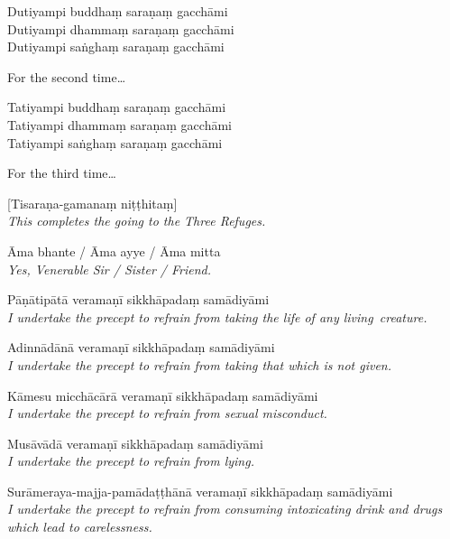 Dutiyampi buddhaṃ saraṇaṃ gacchāmi\\
Dutiyampi dhammaṃ saraṇaṃ gacchāmi\\
Dutiyampi saṅghaṃ saraṇaṃ gacchāmi

\begin{english}
  For the second time\ldots
\end{english}

Tatiyampi buddhaṃ saraṇaṃ gacchāmi\\
Tatiyampi dhammaṃ saraṇaṃ gacchāmi\\
Tatiyampi saṅghaṃ saraṇaṃ gacchāmi

\begin{english}
  For the third time\ldots
\end{english}


[Tisaraṇa-gamanaṃ niṭṭhitaṃ]\\
\emph{This completes the going to the Three Refuges.}


Āma bhante / Āma ayye / Āma mitta\\
\emph{Yes, Venerable Sir / Sister / Friend.}


\enlargethispage{-\baselineskip}

{\raggedright

\begin{packedenumerate}
  \item Pāṇātipātā veramaṇī sikkhāpadaṃ samādiyāmi\\
    \emph{I undertake the precept to refrain from taking the life of any living~creature.}
  \item Adinnādānā veramaṇī sikkhāpadaṃ samādiyāmi\\
    \emph{I undertake the precept to refrain from taking that which is not given.}
  \item Kāmesu micchācārā veramaṇī sikkhāpadaṃ samādiyāmi\\
    \emph{I undertake the precept to refrain from sexual misconduct.}
  \item Musāvādā veramaṇī sikkhāpadaṃ samādiyāmi\\
    \emph{I undertake the precept to refrain from lying.}
  \item Surāmeraya-majja-pamādaṭṭhānā veramaṇī sikkhāpadaṃ samādiyāmi\\
    \emph{I undertake the precept to refrain from consuming intoxicating drink and drugs which lead to carelessness.}
\end{packedenumerate}

}

